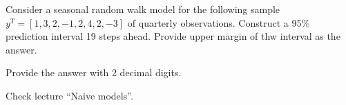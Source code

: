 
\begin{question}
Consider a seasonal random walk model for the following sample \(y^T = [1, 3, 2, -1, 2, 4, 2, -3]\) of quarterly observations. Construct a 95\% prediction interval 19 steps ahead. Provide upper margin of thw interval as the answer.

Provide the answer with 2 decimal digits.
\end{question}

\begin{solution}
Check lecture ``Naive models''.
\end{solution}

